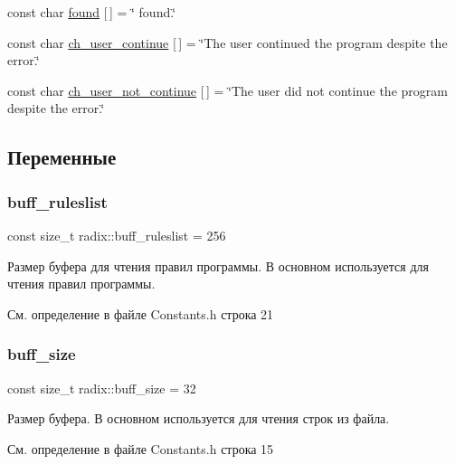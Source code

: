 \begin{DoxyCompactItemize}
\item 
const char \hyperlink{namespaceradix_a27726ea7eb8e2bea153425bce9328be5}{found} \mbox{[}$\,$\mbox{]} = \char`\"{} found.\char`\"{}
\item 
const char \hyperlink{namespaceradix_ad5e76eca849713be360ed8478545d801}{ch\+\_\+user\+\_\+continue} \mbox{[}$\,$\mbox{]} = \char`\"{}The user continued the program despite the error.\char`\"{}
\item 
const char \hyperlink{namespaceradix_afd1855af7805a1bb408ea9175a626ac7}{ch\+\_\+user\+\_\+not\+\_\+continue} \mbox{[}$\,$\mbox{]} = \char`\"{}The user did not continue the program despite the error.\char`\"{}
\end{DoxyCompactItemize}


\subsection{Переменные}
\mbox{\label{namespaceradix_a8f000aabf647d34fd877c33958bad711}} 
\subsubsection{\texorpdfstring{buff\+\_\+ruleslist}{buff\_ruleslist}}
{\footnotesize\ttfamily const size\+\_\+t radix\+::buff\+\_\+ruleslist = 256}

Размер буфера для чтения правил программы. В основном используется для чтения правил программы. 

См. определение в файле Constants.\+h строка 21

\mbox{\label{namespaceradix_a82e81e89088b6430b7ec11a8a0329e9c}} 
\subsubsection{\texorpdfstring{buff\+\_\+size}{buff\_size}}
{\footnotesize\ttfamily const size\+\_\+t radix\+::buff\+\_\+size = 32}

Размер буфера. В основном используется для чтения строк из файла. 

См. определение в файле Constants.\+h строка 15

\mbox{\label{namespaceradix_ad5e76eca849713be360ed8478545d801}} 
